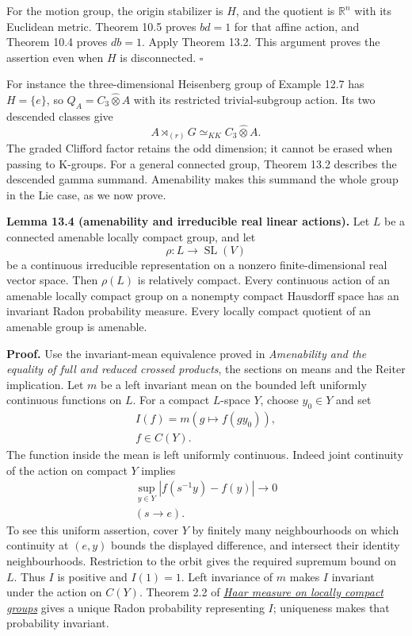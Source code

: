 \documentclass[
  11pt,
]{article}
\begin{document}
For the motion group, the origin stabilizer is \(H\), and the quotient
is \(\mathbb R^n\) with its Euclidean metric. Theorem 10.5 proves
\(bd=1\) for that affine action, and Theorem 10.4 proves \(db=1\). Apply
Theorem 13.2. This argument proves the assertion even when \(H\) is
disconnected. \(\square\)

For instance the three-dimensional Heisenberg group of Example 12.7 has
\(H=\{e\}\), so \(Q_A=C_3\widehat\otimes A\) with its restricted
trivial-subgroup action. Its two descended classes give \[
A\rtimes_{(r)}G\simeq_{KK} C_3\widehat\otimes A.
\tag{13.18}
\] The graded Clifford factor retains the odd dimension; it cannot be
erased when passing to K-groups. For a general connected group, Theorem
13.2 describes the descended gamma summand. Amenability makes this
summand the whole group in the Lie case, as we now prove.

\textbf{Lemma 13.4 (amenability and irreducible real linear actions).}
Let \(L\) be a connected amenable locally compact group, and let \[
\rho:L\longrightarrow\operatorname{SL}(V)
\tag{13.19}
\] be a continuous irreducible representation on a nonzero
finite-dimensional real vector space. Then \(\rho(L)\) is relatively
compact. Every continuous action of an amenable locally compact group on
a nonempty compact Hausdorff space has an invariant Radon probability
measure. Every locally compact quotient of an amenable group is
amenable.

\textbf{Proof.} Use the invariant-mean equivalence proved in
\emph{Amenability and the equality of full and reduced crossed
products}, the sections on means and the Reiter implication. Let \(m\)
be a left invariant mean on the bounded left uniformly continuous
functions on \(L\). For a compact \(L\)-space \(Y\), choose \(y_0\in Y\)
and set \[
\begin{gathered}
I(f)=m(g\longmapsto f(gy_0)),\\
f\in C(Y).
\end{gathered}
\tag{13.20}
\] The function inside the mean is left uniformly continuous. Indeed
joint continuity of the action on compact \(Y\) implies \[
\begin{gathered}
\sup_{y\in Y}|f(s^{-1}y)-f(y)|\longrightarrow0\\
(s\longrightarrow e).
\end{gathered}
\tag{13.21}
\] To see this uniform assertion, cover \(Y\) by finitely many
neighbourhoods on which continuity at \((e,y)\) bounds the displayed
difference, and intersect their identity neighbourhoods. Restriction to
the orbit gives the required supremum bound on \(L\). Thus \(I\) is
positive and \(I(1)=1\). Left invariance of \(m\) makes \(I\) invariant
under the action on \(C(Y)\). Theorem 2.2 of
\href{https://kokunoyumeto.github.io/open-math-courses/courses/harmonic-analysis-on-locally-compact-groups/reader/haar-measure-on-locally-compact-groups.html}{\emph{Haar
measure on locally compact groups}} gives a unique Radon probability
representing \(I\); uniqueness makes that probability invariant.
\end{document}
